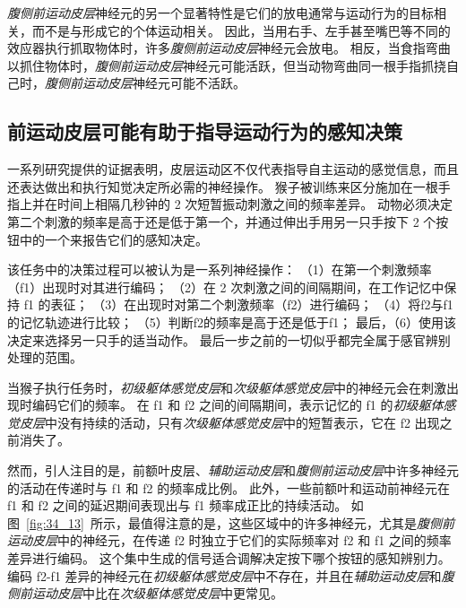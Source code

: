 \textit{腹侧前运动皮层}神经元的另一个显著特性是它们的放电通常与运动行为的目标相关，而不是与形成它的个体运动相关。
因此，当用右手、左手甚至嘴巴等不同的效应器执行抓取物体时，许多\textit{腹侧前运动皮层}神经元会放电。
相反，当食指弯曲以抓住物体时，\textit{腹侧前运动皮层}神经元可能活跃，但当动物弯曲同一根手指抓挠自己时，\textit{腹侧前运动皮层}神经元可能不活跃。



\subsection{前运动皮层可能有助于指导运动行为的感知决策}

一系列研究提供的证据表明，皮层运动区不仅代表指导自主运动的感觉信息，而且还表达做出和执行知觉决定所必需的神经操作。
猴子被训练来区分施加在一根手指上并在时间上相隔几秒钟的 2 次短暂振动刺激之间的频率差异。
动物必须决定第二个刺激的频率是高于还是低于第一个，并通过伸出手用另一只手按下 2 个按钮中的一个来报告它们的感知决定。


该任务中的决策过程可以被认为是一系列神经操作：
（1）在第一个刺激频率（f1）出现时对其进行编码；
（2）在 2 次刺激之间的间隔期间，在工作记忆中保持 f1 的表征；
（3）在出现时对第二个刺激频率（f2）进行编码；
（4）将f2与f1的记忆轨迹进行比较；
（5）判断f2的频率是高于还是低于f1；
最后，（6）使用该决定来选择另一只手的适当动作。
最后一步之前的一切似乎都完全属于感官辨别处理的范围。


当猴子执行任务时，\textit{初级躯体感觉皮层}和\textit{次级躯体感觉皮层}中的神经元会在刺激出现时编码它们的频率。
在 f1 和 f2 之间的间隔期间，表示记忆的 f1 的\textit{初级躯体感觉皮层}中没有持续的活动，只有\textit{次级躯体感觉皮层}中的短暂表示，它在 f2 出现之前消失了。


然而，引人注目的是，前额叶皮层、\textit{辅助运动皮层}和\textit{腹侧前运动皮层}中许多神经元的活动在传递时与 f1 和 f2 的频率成比例。
此外，一些前额叶和运动前神经元在 f1 和 f2 之间的延迟期间表现出与 f1 频率成正比的持续活动。
如图~\ref{fig:34_13}~所示，最值得注意的是，这些区域中的许多神经元，尤其是\textit{腹侧前运动皮层}中的神经元，在传递 f2 时独立于它们的实际频率对 f2 和 f1 之间的频率差异进行编码。 
这个集中生成的信号适合调解决定按下哪个按钮的感知辨别力。
编码 f2-f1 差异的神经元在\textit{初级躯体感觉皮层}中不存在，并且在\textit{辅助运动皮层}和\textit{腹侧前运动皮层}中比在\textit{次级躯体感觉皮层}中更常见。


